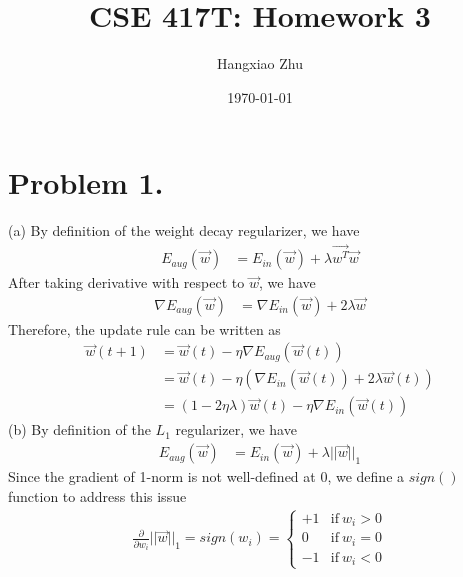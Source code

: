 \documentclass{article}
\begin{document}
    \onehalfspacing

    \begin{singlespace}
        \title{CSE 417T: Homework 3} 
        \author{Hangxiao Zhu}
        \date{\today}
        \maketitle
    \end{singlespace}

    \section*{Problem 1.}
    (a) By definition of the weight decay regularizer, we have
    \begin{align*}
        E_{aug}(\overset{\to}{w}) & = E_{in}(\overset{\to}{w}) + \lambda \overset{\to}{w^T} \overset{\to}{w}
    \end{align*}
    After taking derivative with respect to $\overset{\to}{w}$, we have
    \begin{align*}
        \nabla E_{aug}(\overset{\to}{w}) & = \nabla E_{in}(\overset{\to}{w}) + 2\lambda \overset{\to}{w}
    \end{align*}
    Therefore, the update rule can be written as
    \begin{align*}
        \overset{\to}{w}(t+1) & = \overset{\to}{w}(t) - \eta \nabla E_{aug}(\overset{\to}{w}(t))\\
        & = \overset{\to}{w}(t) - \eta (\nabla E_{in}(\overset{\to}{w}(t)) + 2\lambda \overset{\to}{w}(t))\\
        & = (1 - 2 \eta \lambda)\overset{\to}{w}(t) - \eta \nabla E_{in}(\overset{\to}{w}(t))
    \end{align*}
    (b) By definition of the $L_1$ regularizer, we have
    \begin{align*}
        E_{aug}(\overset{\to}{w}) & = E_{in}(\overset{\to}{w}) + \lambda ||\overset{\to}{w}||_1
    \end{align*}
    Since the gradient of 1-norm is not well-defined at 0, we define a $sign()$ function to address this issue
    \begin{align*}
        \frac{\partial}{\partial w_i}||\overset{\to}{w}||_1 = sign(w_i) = 
        \begin{cases}
            +1 & \text{if} \ w_i > 0\\
            0 & \text{if} \ w_i = 0\\
            -1 & \text{if} \ w_i < 0
        \end{cases}
    \end{align*}
\end{document}
